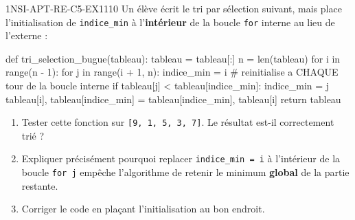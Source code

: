 

\begin{exercice}{1NSI-APT-RE-C5-EX1}{1}{10}
Un élève écrit le tri par sélection suivant, mais place l'initialisation de
\lstinline{indice_min} à l'\textbf{intérieur} de la boucle \lstinline{for} interne au lieu
de l'externe :
\begin{python}
def tri_selection_bugue(tableau):
    tableau = tableau[:]
    n = len(tableau)
    for i in range(n - 1):
        for j in range(i + 1, n):
            indice_min = i  # reinitialise a CHAQUE tour de la boucle interne
            if tableau[j] < tableau[indice_min]:
                indice_min = j
        tableau[i], tableau[indice_min] = tableau[indice_min], tableau[i]
    return tableau
\end{python}
\begin{enumerate}
  \item Tester cette fonction sur \lstinline{[9, 1, 5, 3, 7]}. Le résultat est-il correctement trié ?
  \item Expliquer précisément pourquoi replacer \lstinline{indice_min = i} à l'intérieur de la boucle \lstinline{for j} empêche l'algorithme de retenir le minimum \textbf{global} de la partie restante.
  \item Corriger le code en plaçant l'initialisation au bon endroit.
\end{enumerate}
\end{exercice}

